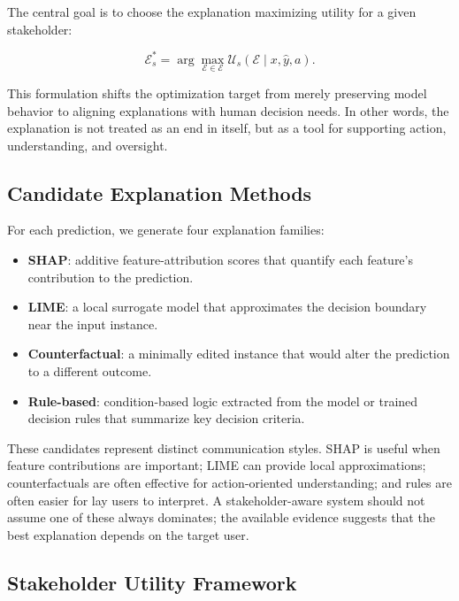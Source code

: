 \documentclass{article}
\begin{document}
The central goal is to choose the explanation maximizing utility for a given stakeholder:

\begin{equation}
\mathcal{E}^*_s = \arg\max_{\mathcal{E} \in \mathcal{E}} \mathcal{U}_s(\mathcal{E} \mid x, \hat{y}, a).
\end{equation}

This formulation shifts the optimization target from merely preserving model behavior to aligning explanations with human decision needs. In other words, the explanation is not treated as an end in itself, but as a tool for supporting action, understanding, and oversight.

\subsection{Candidate Explanation Methods}

For each prediction, we generate four explanation families:

\begin{itemize}[leftmargin=1.5em]
    \item \textbf{SHAP}: additive feature-attribution scores that quantify each feature's contribution to the prediction.
    \item \textbf{LIME}: a local surrogate model that approximates the decision boundary near the input instance.
    \item \textbf{Counterfactual}: a minimally edited instance that would alter the prediction to a different outcome.
    \item \textbf{Rule-based}: condition-based logic extracted from the model or trained decision rules that summarize key decision criteria.
\end{itemize}

These candidates represent distinct communication styles. SHAP is useful when feature contributions are important; LIME can provide local approximations; counterfactuals are often effective for action-oriented understanding; and rules are often easier for lay users to interpret. A stakeholder-aware system should not assume one of these always dominates; the available evidence suggests that the best explanation depends on the target user.

\subsection{Stakeholder Utility Framework}
\end{document}
